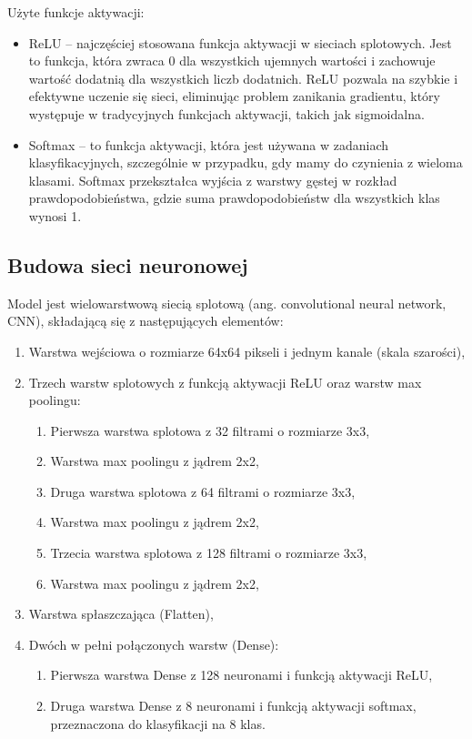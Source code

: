 Użyte funkcje aktywacji:
\begin{itemize}
    \item ReLU -- najczęściej stosowana funkcja aktywacji w sieciach splotowych.
    Jest to funkcja, która zwraca 0 dla wszystkich ujemnych wartości i zachowuje wartość dodatnią dla wszystkich liczb dodatnich.
    ReLU pozwala na szybkie i efektywne uczenie się sieci, eliminując problem zanikania gradientu,
    który występuje w tradycyjnych funkcjach aktywacji, takich jak sigmoidalna.
    \item Softmax -- to funkcja aktywacji, która jest używana w zadaniach klasyfikacyjnych,
    szczególnie w przypadku, gdy mamy do czynienia z wieloma klasami.
    Softmax przekształca wyjścia z warstwy gęstej w rozkład prawdopodobieństwa,
    gdzie suma prawdopodobieństw dla wszystkich klas wynosi 1.
\end{itemize}

\subsection{Budowa sieci neuronowej}\label{subsec:budowa-sieci-neuronowej}
Model jest wielowarstwową siecią splotową (ang. convolutional neural network, CNN),
składającą się z następujących elementów:

\begin{enumerate}
    \item Warstwa wejściowa o rozmiarze 64x64 pikseli i jednym kanale (skala szarości),
    \item Trzech warstw splotowych z funkcją aktywacji ReLU oraz warstw max poolingu:
    \begin{enumerate}
        \item Pierwsza warstwa splotowa z 32 filtrami o rozmiarze 3x3,
        \item Warstwa max poolingu z jądrem 2x2,
        \item Druga warstwa splotowa z 64 filtrami o rozmiarze 3x3,
        \item Warstwa max poolingu z jądrem 2x2,
        \item Trzecia warstwa splotowa z 128 filtrami o rozmiarze 3x3,
        \item Warstwa max poolingu z jądrem 2x2,
    \end{enumerate}
    \item Warstwa spłaszczająca (Flatten),
    \item Dwóch w pełni połączonych warstw (Dense):
    \begin{enumerate}
        \item Pierwsza warstwa Dense z 128 neuronami i funkcją aktywacji ReLU,
        \item Druga warstwa Dense z 8 neuronami i funkcją aktywacji softmax, przeznaczona do klasyfikacji na 8 klas.
    \end{enumerate}
\end{enumerate}

